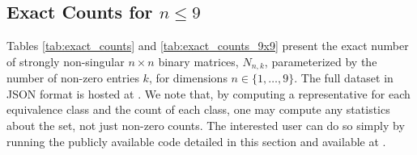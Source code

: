 \documentclass[reqno]{amsart}
\numberwithin{equation}{section}
\begin{document}
\subsection{Exact Counts for $n \le 9$}\label{sub:exact}


Tables \ref{tab:exact_counts} and \ref{tab:exact_counts_9x9} present the exact number of strongly non-singular $n \times n$ binary matrices, $N_{n,k}$, parameterized by the number of non-zero entries $k$, for dimensions $n \in \{1, \dots, 9\}$. The full dataset in JSON format is hosted at \cite{OrellanaMateo2026Repo}. We note that, by computing a representative for each equivalence class and the count of each class, one may compute any statistics about the set, not just non-zero counts. The interested user can do so simply by running the publicly available code detailed in this section and available at \cite{OrellanaMateo2026Repo}.
\end{document}
